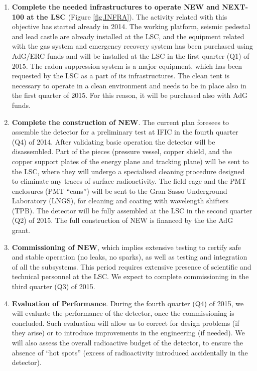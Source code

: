 \begin{enumerate}
\item {\bf Complete the needed infrastructures to operate NEW and NEXT-100 at the LSC} (Figure \ref{fig.INFRA}). The activity related with this objective has started already in 2014. The working platform, seismic pedestal and lead castle are already installed at the LSC, and the equipment related with the gas system and emergency recovery system has been purchased using AdG/ERC funds and will be installed at the LSC in the first quarter (Q1) of 2015. The radon suppression system is a major equipment, which has been requested by the LSC as a part of its infrastructures. The clean tent is necessary to operate in a clean environment and needs to be in place also in the first quarter of 2015. For this reason, it will be purchased also with AdG funds. 

\item {\bf Complete the construction of NEW}. The current plan foresees to assemble the detector for a preliminary test at IFIC in the fourth quarter (Q4) of 2014. After validating basic operation the detector will be disassembled. Part of the pieces (pressure vessel, copper shield, and the copper support plates of the energy plane and tracking plane) will be sent to the LSC, where they will undergo a specialised cleaning procedure designed to eliminate any traces of surface radioactivity. The field cage and the PMT enclosures (PMT ``cans'') will be sent to the Gran Sasso Underground Laboratory (LNGS), for cleaning and coating with wavelength shifters (TPB). The detector will be fully assembled at the LSC in the second quarter (Q2) of 2015. The full construction of NEW is financed by the the AdG grant. 
 
\item {\bf Commissioning of NEW}, which implies extensive testing to certify safe and stable operation (no leaks, no sparks), as well as testing and integration of all the subsystems. This period requires extensive presence of scientific and technical personnel at the LSC. We expect to complete commissioning in the third quarter (Q3) of 2015.

\item {\bf Evaluation of Performance}. During the fourth quarter (Q4) of 2015, we will evaluate the performance of the detector, once the commissioning is concluded. Such evaluation will allow us to correct for design problems (if they arise) or to introduce improvements in the engineering (if needed). We will also assess the overall radioactive budget of the detector, to ensure the absence of ``hot spots'' (excess of radioactivity introduced accidentally in the detector). 


\end{enumerate}
